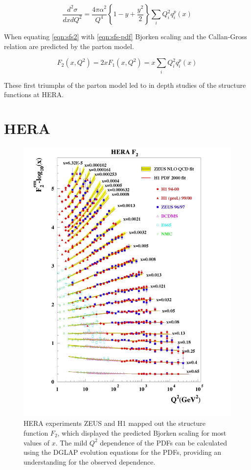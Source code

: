 \begin{equation}
	\label{eqn:sfs-pdf}
	\frac{d^2\sigma}{dx dQ^2} = \frac{4 \pi \alpha^2}{Q^4} \left\lbrace 1 - y + \frac{y^2}{2} \right\rbrace \sum_{i} Q_i^2 q_i^p (x)
\end{equation}

When equating \ref{eqn:sfs2} with \ref{eqn:sfs-pdf} Bjorken scaling and the Callan-Gross relation are predicted by the parton model.

\begin{equation}
	\label{eqn:bjorken-scaling}
	F_{2} (x, Q^2) = 2xF_1 (x, Q^2) = x \sum_{i} Q_i^2 q_i^p(x)
\end{equation}

These first triumphs of the parton model led to in depth studies of the structure functions at HERA.

\section{HERA}

\begin{figure}
	\centering
	\includegraphics[width = \textwidth]{image/plots/introduction/f2.jpg}	
	\caption[$F_{2} (Q^2)$ results from HERA]{HERA experiments ZEUS and H1 mapped out the structure function $F_2$, which displayed the predicted Bjorken scaling for most values of $x$.   The mild $Q^2$ dependence of the PDFs can be calculated using the DGLAP evolution equations for the PDFs, providing an understanding for the observed dependence.}
	\label{fig:f2}
\end{figure}

